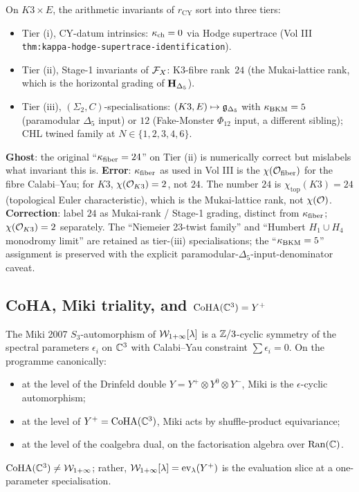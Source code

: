 \begin{theorem}\ClaimStatusHealed
\label{wn:thm:healed-three-tier}
On $K3 \times E$, the arithmetic invariants of $r_{\mathrm{CY}}$ sort into three tiers:
\begin{itemize}
\item Tier (i), CY-datum intrinsics: $\kappa_{\mathrm{ch}} = 0$ via Hodge supertrace (Vol III \texttt{thm:kappa-hodge-supertrace-identification}).
\item Tier (ii), Stage-1 invariants of $\mathcal{F}_X$: K3-fibre rank~$24$ (the Mukai-lattice rank, which is the horizontal grading of $\mathbf{H}_{\Delta_5}$).
\item Tier (iii), $(\Sigma_2, C)$-specialisations: $(K3, E) \mapsto \mathfrak{g}_{\Delta_5}$ with $\kappa_{\mathrm{BKM}} = 5$ (paramodular $\Delta_5$ input) or $12$ (Fake-Monster $\Phi_{12}$ input, a different sibling); CHL twined family at $N \in \{1, 2, 3, 4, 6\}$.
\end{itemize}
\end{theorem}

\textbf{Ghost}: the original ``$\kappa_{\mathrm{fiber}} = 24$'' on Tier (ii) is numerically correct but mislabels what invariant this is. \textbf{Error}: $\kappa_{\mathrm{fiber}}$ as used in Vol III is the $\chi(\mathcal{O}_{\mathrm{fiber}})$ for the fibre Calabi--Yau; for $K3$, $\chi(\mathcal{O}_{K3}) = 2$, not $24$. The number $24$ is $\chi_{\mathrm{top}}(K3) = 24$ (topological Euler characteristic), which is the Mukai-lattice rank, not $\chi(\mathcal{O})$. \textbf{Correction}: label $24$ as Mukai-rank / Stage-1 grading, distinct from $\kappa_{\mathrm{fiber}}$; $\chi(\mathcal{O}_{K3}) = 2$ separately. The ``Niemeier 23-twist family'' and ``Humbert $H_1 \cup H_4$ monodromy limit'' are retained as tier-(iii) specialisations; the ``$\kappa_{\mathrm{BKM}} = 5$'' assignment is preserved with the explicit paramodular-$\Delta_5$-input-denominator caveat.

\subsection{CoHA, Miki triality, and $\mathrm{CoHA}(\mathbb{C}^3) = Y^+$}
\label{wn:subsec:healed-CoHA-Miki}

\begin{theorem}\ClaimStatusHealed
\label{wn:thm:healed-Miki-S3}
The Miki 2007 $S_3$-automorphism of $\mathcal{W}_{1+\infty}[\lambda]$ is a $\mathbb{Z}/3$-cyclic symmetry of the spectral parameters $\epsilon_i$ on $\mathbb{C}^3$ with Calabi--Yau constraint $\sum \epsilon_i = 0$. On the programme canonically:
\begin{itemize}
\item at the level of the Drinfeld double $Y = Y^+ \otimes Y^0 \otimes Y^-$, Miki is the $\epsilon$-cyclic automorphism;
\item at the level of $Y^+ = \mathrm{CoHA}(\mathbb{C}^3)$, Miki acts by shuffle-product equivariance;
\item at the level of the coalgebra dual, on the factorisation algebra over $\mathrm{Ran}(\mathbb{C})$.
\end{itemize}
$\mathrm{CoHA}(\mathbb{C}^3) \neq \mathcal{W}_{1+\infty}$; rather, $\mathcal{W}_{1+\infty}[\lambda] = \mathrm{ev}_\lambda(Y^+)$ is the evaluation slice at a one-parameter specialisation.
\end{theorem}

